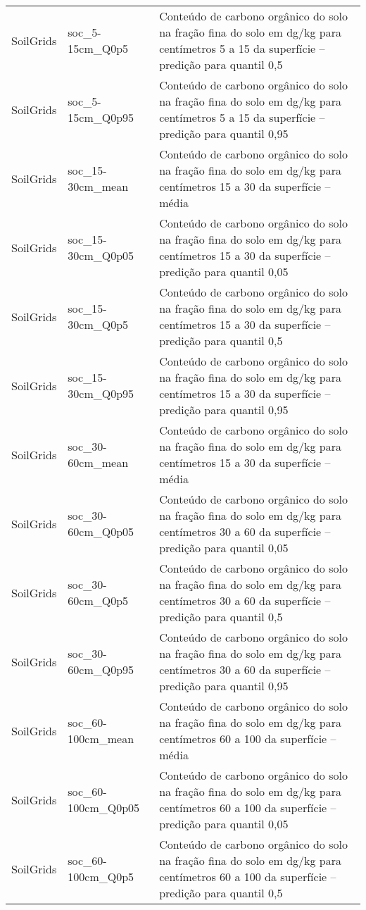 \begin{longtable}{@{} p{4cm} p{4cm} p{8cm} @{}}
	SoilGrids &
	soc\_5-15cm\_Q0p5 &
	Conteúdo de carbono orgânico do solo na fração fina do solo em dg/kg para centímetros 5 a 15 da superfície – predição para quantil 0,5 \\
	SoilGrids &
	soc\_5-15cm\_Q0p95 &
	Conteúdo de carbono orgânico do solo na fração fina do solo em dg/kg para centímetros 5 a 15 da superfície – predição para quantil 0,95 \\
	SoilGrids &
	soc\_15-30cm\_mean &
	Conteúdo de carbono orgânico do solo na fração fina do solo em dg/kg para centímetros 15 a 30 da superfície – média \\
	SoilGrids &
	soc\_15-30cm\_Q0p05 &
	Conteúdo de carbono orgânico do solo na fração fina do solo em dg/kg para centímetros 15 a 30 da superfície – predição para quantil 0,05 \\
	SoilGrids &
	soc\_15-30cm\_Q0p5 &
	Conteúdo de carbono orgânico do solo na fração fina do solo em dg/kg para centímetros 15 a 30 da superfície – predição para quantil 0,5 \\
	SoilGrids &
	soc\_15-30cm\_Q0p95 &
	Conteúdo de carbono orgânico do solo na fração fina do solo em dg/kg para centímetros 15 a 30 da superfície – predição para quantil 0,95 \\
	SoilGrids &
	soc\_30-60cm\_mean &
	Conteúdo de carbono orgânico do solo na fração fina do solo em dg/kg para centímetros 15 a 30 da superfície – média \\
	SoilGrids &
	soc\_30-60cm\_Q0p05 &
	Conteúdo de carbono orgânico do solo na fração fina do solo em dg/kg para centímetros 30 a 60 da superfície – predição para quantil 0,05 \\
	SoilGrids &
	soc\_30-60cm\_Q0p5 &
	Conteúdo de carbono orgânico do solo na fração fina do solo em dg/kg para centímetros 30 a 60 da superfície – predição para quantil 0,5 \\
	SoilGrids &
	soc\_30-60cm\_Q0p95 &
	Conteúdo de carbono orgânico do solo na fração fina do solo em dg/kg para centímetros 30 a 60 da superfície – predição para quantil 0,95 \\
	SoilGrids &
	soc\_60-100cm\_mean &
	Conteúdo de carbono orgânico do solo na fração fina do solo em dg/kg para centímetros 60 a 100 da superfície – média \\
	SoilGrids &
	soc\_60-100cm\_Q0p05 &
	Conteúdo de carbono orgânico do solo na fração fina do solo em dg/kg para centímetros 60 a 100 da superfície – predição para quantil 0,05 \\
	SoilGrids &
	soc\_60-100cm\_Q0p5 &
	Conteúdo de carbono orgânico do solo na fração fina do solo em dg/kg para centímetros 60 a 100 da superfície – predição para quantil 0,5 \\

\end{longtable}

